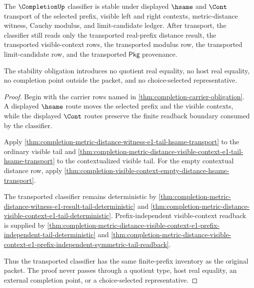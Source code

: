 \begin{theorem}\label{thm:completion-classifier-stability-obligation}
The $\CompletionUp$ classifier is stable under displayed $\hsame$ and $\Cont$ transport of the selected prefix, visible left and right contexts, metric-distance witness, Cauchy modulus, and limit-candidate ledger. After transport, the classifier still reads only the transported real-prefix distance result, the transported visible-context rows, the transported modulus row, the transported limit-candidate row, and the transported $\mathsf{Pkg}$ provenance.

The stability obligation introduces no quotient real equality, no host real equality, no completion point outside the packet, and no choice-selected representative.
\end{theorem}
\begin{proof}
Begin with the carrier rows named in \autoref{thm:completion-carrier-obligation}. A displayed $\hsame$ route moves the selected prefix and the visible contexts, while the displayed $\Cont$ routes preserve the finite readback boundary consumed by the classifier.

Apply \autoref{thm:completion-metric-distance-witness-e1-tail-hsame-transport} to the ordinary visible tail and \autoref{thm:completion-metric-distance-visible-context-e1-tail-hsame-transport} to the contextualized visible tail. For the empty contextual distance row, apply \autoref{thm:completion-visible-context-empty-distance-hsame-transport}.

The transported classifier remains deterministic by \autoref{thm:completion-metric-distance-witness-e1-result-tail-deterministic} and \autoref{thm:completion-metric-distance-visible-context-e1-tail-deterministic}. Prefix-independent visible-context readback is supplied by \autoref{thm:completion-metric-distance-visible-context-e1-prefix-independent-tail-deterministic} and \autoref{thm:completion-metric-distance-visible-context-e1-prefix-independent-symmetric-tail-readback}.

Thus the transported classifier has the same finite-prefix inventory as the original packet. The proof never passes through a quotient type, host real equality, an external completion point, or a choice-selected representative.
\end{proof}

